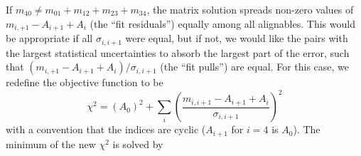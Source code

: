 \documentclass[12pt]{article}
\begin{document}
If $m_{40} \ne m_{01} + m_{12} + m_{23} + m_{34}$, the matrix solution
spreads non-zero values of $m_{i,+1} - A_{i+1} + A_i$ (the
``fit residuals'') equally among all alignables.  This would be
appropriate if all $\sigma_{i,i+1}$ were equal, but if not, we would
like the pairs with the largest statistical uncertainties to absorb
the largest part of the error, such that $(m_{i,+1} - A_{i+1} +
A_i)/\sigma_{i,i+1}$ (the ``fit pulls'') are equal.  For this case, we
redefine the objective function to be
\begin{equation}
\chi^2 = (A_0)^2 + \sum_i \left(\frac{m_{i,i+1} - A_{i+1} + A_i}{\sigma_{i,i+1}}\right)^2
\label{eqn:propagating_example_newchi2}
\end{equation}
with a convention that the indices are cyclic ($A_{i+1}$ for $i=4$ is
$A_0$).  The minimum of the new $\chi^2$ is solved by
\end{document}
